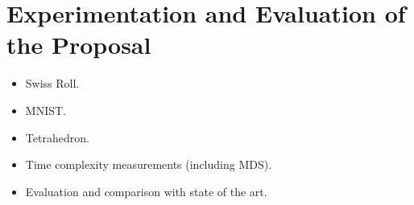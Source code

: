 \section{Experimentation and Evaluation of the Proposal}

\begin{itemize}
    \item Swiss Roll.
    \item MNIST.
    \item Tetrahedron.
    \item Time complexity measurements (including MDS).
    \item Evaluation and comparison with state of the art.
\end{itemize}